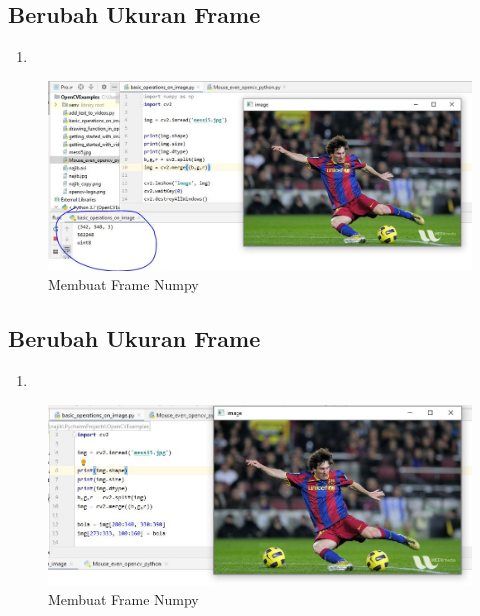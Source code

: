 \newpage
\subsection{Berubah Ukuran Frame}

\begin{enumerate}
	\item
\end{enumerate}

\newpage
\begin{figure}[ht]
\centering
\includegraphics[scale=0.5]{figures/2,26.jpg}
\caption{Membuat Frame Numpy}
\label{contoh}
\end{figure}



\newpage
\subsection{Berubah Ukuran Frame}

\begin{enumerate}
	\item
\end{enumerate}

\newpage
\begin{figure}[ht]
\centering
\includegraphics[scale=0.5]{figures/2,27.jpg}
\caption{Membuat Frame Numpy}
\label{contoh}
\end{figure}



